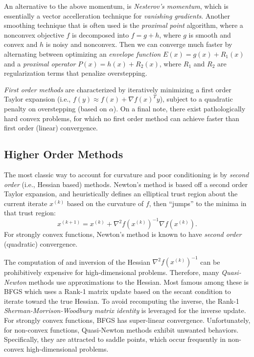 \documentclass[12pt]{article}
\begin{document}
An alternative to the above momentum, is {\it Nesterov's momentum}, 
which is essentially a vector accelleration technique for 
{\it vanishing gradients}.
Another smoothing technique that is often used is the {\it proximal point}
algorithm, where a nonconvex objective $f$ is decomposed into $f = g + h$, 
where $g$ is smooth and convex and $h$ is noisy and nonconvex.
Then we can converge much faster by alternating between optimizing an 
{\it envelope function} $E(x) = g(x) + R_1(x)$ and a 
{\it proximal operator} $P(x) = h(x) + R_2(x)$, where $R_1$ and $R_2$ 
are regularization terms that penalize overstepping.

{\it First order methods} are characterized by iteratively minimizing a
first order Taylor expansion (i.e., $f(y) \approx f(x) + \nabla f(x)^T y$),
subject to a quadratic penalty on overstepping (based on $\alpha$).
On a final note, there exist pathologically hard convex problems, for which no 
first order method can achieve faster than first order (linear) convergence.

\subsection*{Higher Order Methods}

The most classic way to account for curvature and poor conditioning is by 
{\it second order} (i.e., Hessian based) methods.
Newton's method is based off a second order Taylor expansion, and heuristically
defines an elliptical trust region about the current iterate $x^{(k)}$ based 
on the curvature of $f$, then ``jumps'' to the minima in that trust region:
\begin{equation}
\label{newton}
x^{(k+1)} = x^{(k)} + \nabla^2 f(x^{(k)})^{-1} \nabla f(x^{(k)}).
\end{equation}
For strongly convex functions, Newton's method is known to
have {\it second order} (quadratic) convergence.

The computation of and inversion of the Hessian 
$\nabla^2 f(x^{(k)})^{-1}$ can be prohibitively expensive for
high-dimensional problems.
Therefore, many {\it Quasi-Newton} methods use approximations to
the Hessian.
Most famous among these is BFGS which uses a Rank-1 matrix
update based on the secant condition to iterate toward the
true Hessian.
To avoid recomputing the inverse, the Rank-1 
{\it Sherman-Morrison-Woodbury matrix identity} is leveraged for the inverse
update.
For strongly convex functions, BFGS has super-linear convergence.
Unfortunately, for non-convex functions, Quasi-Newton
methods exhibit unwanted behaviors.
Specifically, they are attracted to saddle points, which occur
frequently in non-convex high-dimensional problems.
\end{document}
